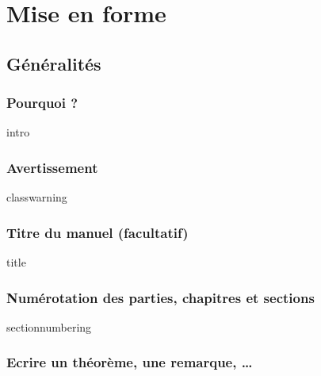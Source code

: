 \documentclass[14pt]{memoir}
\begin{document}



\part{Mise en forme}

\chapter{Généralités}

\section{Pourquoi ?}

{intro}




\section{Avertissement}

{classwarning}




\section{Titre du manuel (facultatif)}

{title}




\section{Numérotation des parties, chapitres et sections}

{sectionnumbering}




\section{Ecrire un théorème, une remarque, \dots}
\end{document}
